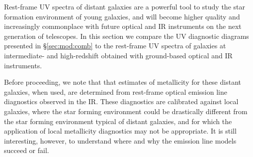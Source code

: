\documentclass[preprint2,trackchanges]{aastex62}
\begin{document}
Rest-frame UV spectra of distant galaxies are a powerful tool to study the star formation environment of young galaxies, and will become higher quality and increasingly commonplace with future optical and IR instruments on the next generation of telescopes. In this section we compare the UV diagnostic diagrams presented in \S\ref{sec:mod:comb} to the rest-frame UV spectra of galaxies at intermediate- and high-redshift obtained with ground-based optical and IR instruments.

Before proceeding, we note that that estimates of metallicity for these distant galaxies, when used, are determined from rest-frame optical emission line diagnostics observed in the IR. These diagnostics are calibrated against local galaxies, where the star forming environment could be drastically different from the star forming environment typical of distant galaxies, and for which the application of local metallicity diagnostics may not be appropriate. It is still interesting, however, to understand where and why the emission line models succeed or fail.
\end{document}
